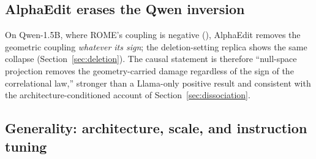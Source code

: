 \subsection{AlphaEdit erases the Qwen inversion}
On Qwen-1.5B, where ROME's coupling is negative (\qwenFifteenSigned{}),
AlphaEdit removes the geometric coupling \emph{whatever its sign}; the
deletion-setting replica shows the same collapse (Section~\ref{sec:deletion}).
The causal statement is therefore ``null-space projection removes the
geometry-carried damage regardless of the sign of the correlational law,''
stronger than a Llama-only positive result and consistent with the
architecture-conditioned account of Section~\ref{sec:dissociation}.

\subsection{Generality: architecture, scale, and instruction tuning}
